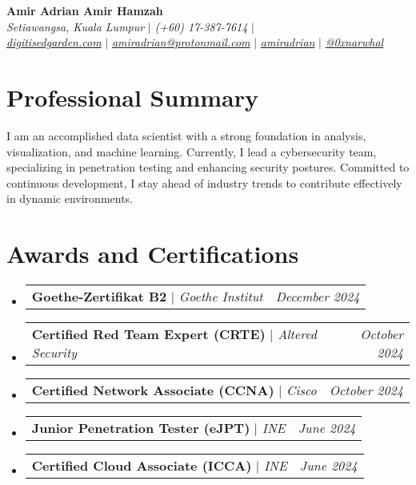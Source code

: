 \documentclass[letterpaper,10pt]{article}
\makeatletter
\newcommand{\sectionspace}{
	\vspace{-20pt}
}
\newcommand{\subheadingtitlevspace}{
	\vspace{-3pt}
}
\newcommand{\titleItem}[1]{
	\textbf{#1}
}
\newcommand{\resumeProjectHeading}[2]{
	\item
	\begin{tabular*}{0.97\textwidth}{l@{\extracolsep{\fill}}r}
		#1 & \textit{ #2} \\
	\end{tabular*}\vspace{-9pt}
}
\newcommand{\resumeSubHeadingListStart}{\subheadingtitlevspace\begin{itemize}[leftmargin=0.15in, label={}]}
\newcommand{\resumeSubHeadingListEnd}{\end{itemize}}
\makeatother
\begin{document}
	
	
	\begin{flushleft}
		\textbf{\large Amir Adrian Amir Hamzah} \\    
		\textit{ Setiawangsa, Kuala Lumpur} $|$ 
		\textit{ (+60) 17-387-7614} $|$  \\	
		\href{https://digitisedgarden.com}{{\textit{ digitisedgarden.com}}} $|$
		\href{mailto:amiradrian@protonmail.com}{{\textit{ amiradrian@protonmail.com}}} $|$ 
		\href{https://linkedin.com/in/amiradrian}{{\textit{ amiradrian}}} $|$
		\href{https://github.com/0xnarwhal}{{\textit{ @0xnarwhal}}}
		\vspace{-8pt}
	\end{flushleft}
	
	
	\section{Professional Summary}
	\vspace{-3pt}
	\begin{itemize}[leftmargin=0.15in, label={}]
		{\item{
				{I am an accomplished data scientist with a strong foundation in analysis, visualization, and machine learning. Currently, I lead a cybersecurity team, specializing in penetration testing and enhancing security postures. Committed to continuous development, I stay ahead of industry trends to contribute effectively in dynamic environments.} \\      
		}}
	\end{itemize}
	\sectionspace
	
	
	
	\section{Awards and Certifications}
	\resumeSubHeadingListStart
	\resumeProjectHeading
	{\titleItem{Goethe-Zertifikat B2} \emph{ $|$ Goethe Institut}}{December 2024}
	\resumeProjectHeading
	{\titleItem{Certified Red Team Expert (CRTE)} \emph{ $|$ Altered Security}}{October 2024}
	\resumeProjectHeading
	{\titleItem{Certified Network Associate (CCNA)} \emph{ $|$ Cisco}}{October 2024}
	\resumeProjectHeading
	{\titleItem{Junior Penetration Tester (eJPT)} \emph{ $|$ INE}}{June 2024}
	\resumeProjectHeading
	{\titleItem{Certified Cloud Associate (ICCA)} \emph{ $|$ INE}}{June 2024}
	\resumeSubHeadingListEnd
	
\end{document}
